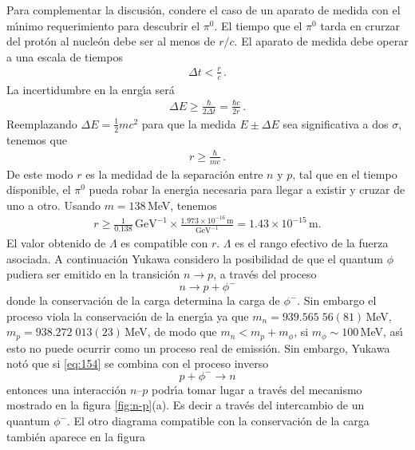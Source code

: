 Para complementar la discusi\'on, condere el caso de un aparato de medida con el m\'\i nimo requerimiento para descubrir el $\pi^0$.
El tiempo que el $\pi^0$ tarda en crurzar del prot\'on al nucle\'on debe ser al menos de $r/c$. El aparato de medida debe operar a una escala de tiempos
\begin{align}
  \Delta t<\frac{r}{c}\,.
\end{align}
La incertidumbre en la enrg\'\i a ser\'a
\begin{align}
  \Delta E\geq \frac{\hbar}{2\Delta t}=\frac{\hbar c}{2r}\,.
\end{align}
Reemplazando $\Delta E=\frac{1}{2}m c^2$ para que la medida $E\pm\Delta E$ sea significativa a dos $\sigma$, tenemos que
\begin{align}
  r\geq \frac{\hbar}{ m c}\,.
\end{align}
De este modo $r$ es la medidad de la separaci\'on entre $n$ y $p$, tal que en el tiempo disponible, el $\pi^0$ pueda robar la energ\'\i a necesaria para llegar a existir y cruzar de uno a otro. Usando $m=138\,$MeV, tenemos 
\begin{align}
  r\geq\frac{1}{0.138}\,\text{GeV}^{-1}\times\frac{1.973\times10^{-16}\,\text{m}}{\text{GeV}^{-1}}=1.43\times10^{-15}\,\text{m}.
\end{align}
El valor obtenido de $\Lambda$ es compatible con $r$. $\Lambda$ es el rango efectivo de la fuerza asociada. 
A continuaci\'on Yukawa considero la posibilidad de que el quantum $\phi$ pudiera ser emitido en la transici\'on $n\to p$, a trav\'es del proceso
\begin{equation}
  \label{eq:154}
  n\to p+\phi^-
\end{equation}
donde la conservaci\'on de la carga determina la carga de $\phi^-$. Sin embargo el proceso viola la conservaci\'on de la energ\'\i a ya que $m_n=939.565\;56(81)\,$MeV, $m_p=938.272\;013(23)\,$MeV, de modo que $m_n\lt m_p+m_\phi$, si $m_\phi\sim100\,$MeV, as\'\i{} esto no puede ocurrir como un proceso real de emissi\'on. Sin embargo, Yukawa not\'o que si \eqref{eq:154} se combina con el proceso inverso
\begin{equation}
  p+\phi^-\to n
\end{equation}
entonces una interacci\'on $n$--$p$ podr\'\i a tomar lugar a trav\'es del mecanismo mostrado en la figura \ref{fig:n-p}(a). Es decir a trav\'es del intercambio de un quantum $\phi^-$. El otro diagrama compatible con la conservaci\'on de la carga tambi\'en aparece en la figura

